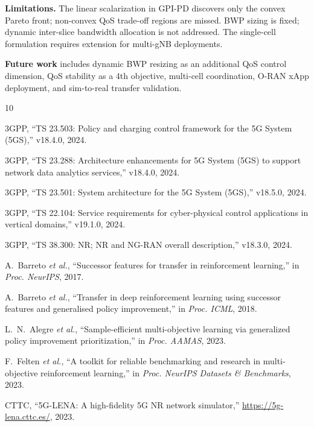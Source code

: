 \documentclass[conference]{IEEEtran}
\newcommand{\etal}{\textit{et al.}}
\begin{document}
\textbf{Limitations.}
The linear scalarization in GPI-PD discovers only the convex Pareto front; non-convex QoS trade-off regions are missed.
BWP sizing is fixed; dynamic inter-slice bandwidth allocation is not addressed.
The single-cell formulation requires extension for multi-gNB deployments.

\textbf{Future work} includes dynamic BWP resizing as an additional QoS control dimension, QoS stability as a 4th objective, multi-cell coordination, O-RAN xApp deployment, and sim-to-real transfer validation.

\balance

\begin{thebibliography}{10}

3GPP, ``TS 23.503: Policy and charging control framework for the 5G System (5GS),'' v18.4.0, 2024.

3GPP, ``TS 23.288: Architecture enhancements for 5G System (5GS) to support network data analytics services,'' v18.4.0, 2024.

3GPP, ``TS 23.501: System architecture for the 5G System (5GS),'' v18.5.0, 2024.

3GPP, ``TS 22.104: Service requirements for cyber-physical control applications in vertical domains,'' v19.1.0, 2024.

3GPP, ``TS 38.300: NR; NR and NG-RAN overall description,'' v18.3.0, 2024.

A.~Barreto \etal, ``Successor features for transfer in reinforcement learning,'' in \emph{Proc. NeurIPS}, 2017.

A.~Barreto \etal, ``Transfer in deep reinforcement learning using successor features and generalised policy improvement,'' in \emph{Proc. ICML}, 2018.

L.~N.~Alegre \etal, ``Sample-efficient multi-objective learning via generalized policy improvement prioritization,'' in \emph{Proc. AAMAS}, 2023.

F.~Felten \etal, ``A toolkit for reliable benchmarking and research in multi-objective reinforcement learning,'' in \emph{Proc. NeurIPS Datasets \& Benchmarks}, 2023.

CTTC, ``5G-LENA: A high-fidelity 5G NR network simulator,'' \url{https://5g-lena.cttc.es/}, 2023.


\end{thebibliography}
\end{document}
